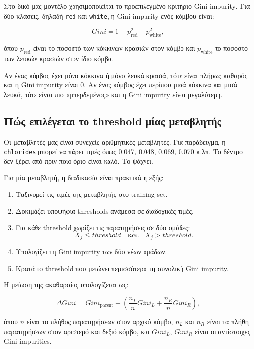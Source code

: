 \documentclass[12pt,a4paper]{article}
\newcommand{\code}[1]{\texttt{\textenglish{#1}}}
\begin{document}
Στο δικό μας μοντέλο χρησιμοποιείται το προεπιλεγμένο κριτήριο
\textenglish{Gini impurity}. Για δύο κλάσεις, δηλαδή \code{red} και
\code{white}, η Gini impurity ενός κόμβου είναι:

\[
    Gini = 1 - p_{\text{red}}^2 - p_{\text{white}}^2,
\]

όπου $p_{\text{red}}$ είναι το ποσοστό των κόκκινων κρασιών στον κόμβο και
$p_{\text{white}}$ το ποσοστό των λευκών κρασιών στον ίδιο κόμβο.

Αν ένας κόμβος έχει μόνο κόκκινα ή μόνο λευκά κρασιά, τότε είναι πλήρως
καθαρός και η Gini impurity είναι 0. Αν ένας κόμβος έχει περίπου μισά κόκκινα
και μισά λευκά, τότε είναι πιο «μπερδεμένος» και η Gini impurity είναι
μεγαλύτερη.

\subsection{Πώς επιλέγεται το threshold μίας μεταβλητής}

Οι μεταβλητές μας είναι συνεχείς αριθμητικές μεταβλητές. Για παράδειγμα, η
\code{chlorides} μπορεί να πάρει τιμές όπως 0.047, 0.048, 0.069, 0.070 κ.λπ.
Το δέντρο δεν ξέρει από πριν ποιο όριο είναι καλό. Το ψάχνει.

Για μία μεταβλητή, η διαδικασία είναι πρακτικά η εξής:

\begin{enumerate}
    \item Ταξινομεί τις τιμές της μεταβλητής στο training set.
    \item Δοκιμάζει υποψήφια thresholds ανάμεσα σε διαδοχικές τιμές.
    \item Για κάθε threshold χωρίζει τις παρατηρήσεις σε δύο ομάδες:
    \[
        X_j \leq threshold
        \quad \text{και} \quad
        X_j > threshold.
    \]
    \item Υπολογίζει τη Gini impurity των δύο νέων ομάδων.
    \item Κρατά το threshold που μειώνει περισσότερο τη συνολική Gini
    impurity.
\end{enumerate}

Η μείωση της ακαθαρσίας υπολογίζεται ως:

\[
    \Delta Gini =
    Gini_{\text{parent}}
    -
    \left(
    \frac{n_L}{n}Gini_L
    +
    \frac{n_R}{n}Gini_R
    \right),
\]

όπου $n$ είναι το πλήθος παρατηρήσεων στον αρχικό κόμβο, $n_L$ και $n_R$ είναι
τα πλήθη παρατηρήσεων στον αριστερό και δεξιό κόμβο, και $Gini_L$, $Gini_R$
είναι οι αντίστοιχες Gini impurities.
\end{document}
